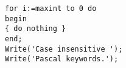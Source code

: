 \begin{comment}
\begin{figure}
        \centering
        \begin{subfigure}[b]{1.0\textwidth}
                \caption{}
                \label{fig:}
        \end{subfigure}%
        ~ %
\hfill etc.
        \begin{subfigure}[b]{1.0\textwidth}
                \caption{}
                \label{fig:}
        \end{subfigure}
        \caption{}\label{fig:}
\end{figure}

\cite{article}
\cite{book}
\end{comment}

\begin{lstlisting}[style=default]
for i:=maxint to 0 do
begin
{ do nothing }
end;
Write('Case insensitive ');
Write('Pascal keywords.');
\end{lstlisting}
